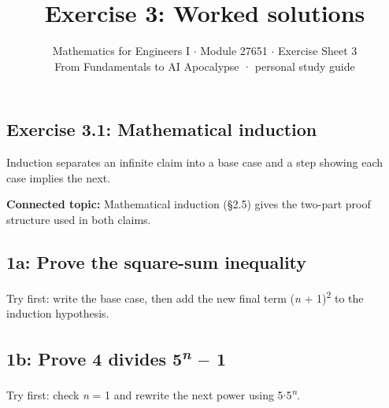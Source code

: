 \documentclass[11pt]{article}
\title{\sffamily\bfseries\color{FAUblue}Exercise 3: Worked solutions}
\author{Mathematics for Engineers I \ensuremath{\cdot} Module 27651 \ensuremath{\cdot} Exercise Sheet 3\\[2pt]\small From Fundamentals to AI Apocalypse · personal study guide}
\date{}
\begin{document}
\maketitle
\begingroup\footnotesize\setlength{\parskip}{0pt}\tableofcontents\endgroup
\clearpage

\begin{keepsection}
\section{Exercise 3.1: Mathematical induction}

Induction separates an infinite claim into a base case and a step showing each case implies the next.

\textbf{Connected topic:} Mathematical induction (§2.5) gives the two-part proof structure used in both claims.

\begin{keepsection}
\subsection{1a: Prove the square-sum inequality}

Try first: write the base case, then add the new final term (\textit{n} + 1)\textsuperscript{2} to the induction hypothesis.

\end{keepsection}

\begin{keepsection}
\subsection{1b: Prove 4 divides 5\textsuperscript{\textit{n}} \ensuremath{-} 1}

Try first: check \textit{n} = 1 and rewrite the next power using 5\ensuremath{\cdot}5\textsuperscript{\textit{n}}.

\end{keepsection}
\end{keepsection}
\end{document}
